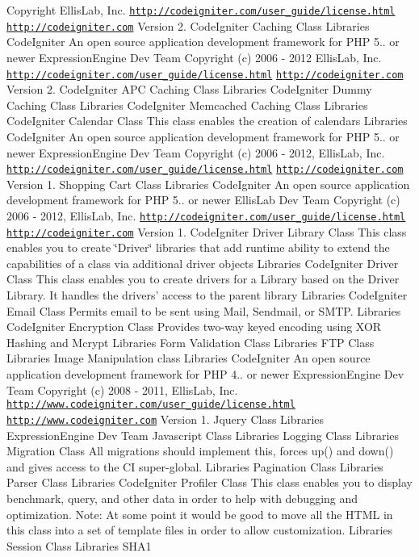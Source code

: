 \begin{DoxyCopyright}{Copyright}
Ellis\-Lab, Inc.  \href{http://codeigniter.com/user_guide/license.html}{\tt http\-://codeigniter.\-com/user\-\_\-guide/license.\-html}  \href{http://codeigniter.com}{\tt http\-://codeigniter.\-com}  Version 2.  Code\-Igniter Caching Class  Libraries Code\-Igniter An open source application development framework for P\-H\-P 5.. or newer  Expression\-Engine Dev Team  Copyright (c) 2006 -\/ 2012 Ellis\-Lab, Inc.  \href{http://codeigniter.com/user_guide/license.html}{\tt http\-://codeigniter.\-com/user\-\_\-guide/license.\-html}  \href{http://codeigniter.com}{\tt http\-://codeigniter.\-com}  Version 2.  Code\-Igniter A\-P\-C Caching Class  Libraries Code\-Igniter Dummy Caching Class  Libraries Code\-Igniter Memcached Caching Class  Libraries Code\-Igniter Calendar Class This class enables the creation of calendars  Libraries Code\-Igniter An open source application development framework for P\-H\-P 5.. or newer  Expression\-Engine Dev Team  Copyright (c) 2006 -\/ 2012, Ellis\-Lab, Inc.  \href{http://codeigniter.com/user_guide/license.html}{\tt http\-://codeigniter.\-com/user\-\_\-guide/license.\-html}  \href{http://codeigniter.com}{\tt http\-://codeigniter.\-com}  Version 1.  Shopping Cart Class  Libraries Code\-Igniter An open source application development framework for P\-H\-P 5.. or newer  Ellis\-Lab Dev Team  Copyright (c) 2006 -\/ 2012, Ellis\-Lab, Inc.  \href{http://codeigniter.com/user_guide/license.html}{\tt http\-://codeigniter.\-com/user\-\_\-guide/license.\-html}  \href{http://codeigniter.com}{\tt http\-://codeigniter.\-com}  Version 1.  Code\-Igniter Driver Library Class This class enables you to create \char`\"{}\-Driver\char`\"{} libraries that add runtime ability to extend the capabilities of a class via additional driver objects  Libraries Code\-Igniter Driver Class This class enables you to create drivers for a Library based on the Driver Library. It handles the drivers' access to the parent library  Libraries Code\-Igniter Email Class Permits email to be sent using Mail, Sendmail, or S\-M\-T\-P.  Libraries Code\-Igniter Encryption Class Provides two-\/way keyed encoding using X\-O\-R Hashing and Mcrypt  Libraries Form Validation Class  Libraries F\-T\-P Class  Libraries Image Manipulation class  Libraries Code\-Igniter An open source application development framework for P\-H\-P 4.. or newer  Expression\-Engine Dev Team  Copyright (c) 2008 -\/ 2011, Ellis\-Lab, Inc.  \href{http://www.codeigniter.com/user_guide/license.html}{\tt http\-://www.\-codeigniter.\-com/user\-\_\-guide/license.\-html}  \href{http://www.codeigniter.com}{\tt http\-://www.\-codeigniter.\-com}  Version 1.  Jquery Class  Libraries  Expression\-Engine Dev Team Javascript Class  Libraries Logging Class  Libraries Migration Class All migrations should implement this, forces up() and down() and gives access to the C\-I super-\/global.  Libraries Pagination Class  Libraries Parser Class  Libraries Code\-Igniter Profiler Class This class enables you to display benchmark, query, and other data in order to help with debugging and optimization. Note\-: At some point it would be good to move all the H\-T\-M\-L in this class into a set of template files in order to allow customization.  Libraries Session Class  Libraries S\-H\-A1 
\end{DoxyCopyright}
